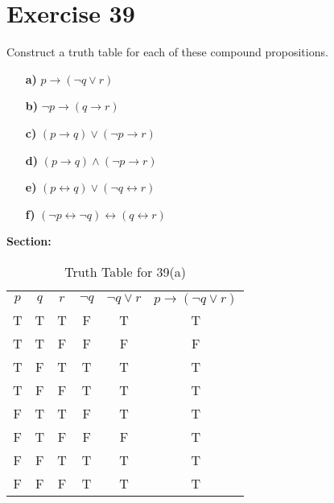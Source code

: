 \documentclass{Axon}
\begin{document}
\section*{Exercise 39}
Construct a truth table for each of these compound propositions.
\begin{enumerate}
    \item[\textbf{a)}] \(p \to (\lnot q \lor r)\)
    \item[\textbf{b)}] \(\lnot p \to (q \to r)\)
    \item[\textbf{c)}] \((p \to q) \lor (\lnot p \to r)\)
    \item[\textbf{d)}] \((p \to q) \land (\lnot p \to r)\)
    \item[\textbf{e)}] \((p \leftrightarrow q) \lor (\lnot q \leftrightarrow r)\)
    \item[\textbf{f)}] \((\lnot p \leftrightarrow \lnot q) \leftrightarrow (q \leftrightarrow r)\)
\end{enumerate}

\noindent
\textbf{Section:}
\begin{table}[ht]
    \centering
    \begin{tabular}{c|c|c|c|c|c}
    \(p\) & \(q\) & \(r\) & \(\lnot q\) & \(\lnot q \lor r\) & \(p \to (\lnot q \lor r)\) \\
    T     & T     & T     & F           & T                  & T                          \\
    T     & T     & F     & F           & F                  & F                          \\
    T     & F     & T     & T           & T                  & T                          \\
    T     & F     & F     & T           & T                  & T                          \\
    F     & T     & T     & F           & T                  & T                          \\
    F     & T     & F     & F           & F                  & T                          \\
    F     & F     & T     & T           & T                  & T                          \\
    F     & F     & F     & T           & T                  & T
    \end{tabular}
    \caption{Truth Table for 39(a)}
\end{table}
\end{document}
